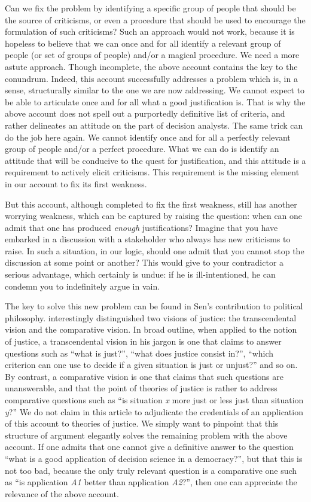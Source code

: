 \documentclass[preprint,11pt]{elsarticle}
\begin{document}
Can we fix the problem by identifying a specific group of people that should be the source of criticisms, or even a procedure that should be used to encourage the formulation of such criticisms? Such an approach would not work, because it is hopeless to believe that we can once and for all identify a relevant group of people (or set of groups of people) and/or a magical procedure. We need a more astute approach. Though incomplete, the above account contains the key to the conundrum. Indeed, this account successfully addresses a problem which is, in a sense, structurally similar to the one we are now addressing. We cannot expect to be able to articulate once and for all what a good justification is. That is why the above account does not spell out a purportedly definitive list of criteria, and rather delineates an attitude on the part of decision analysts. The same trick can do the job here again. We cannot identify once and for all a perfectly relevant group of people and/or a perfect procedure. What we can do is identify an attitude that will be conducive to the quest for justification, and this attitude is a requirement to actively elicit criticisms. This requirement is the missing element in our account to fix its first weakness.

But this account, although completed to fix the first weakness, still has another worrying weakness, which can be captured by raising the question: when can one admit that one has produced \emph{enough} justifications? Imagine that you have embarked in a discussion with a stakeholder who always has new criticisms to raise. In such a situation, in our logic, should one admit that you cannot stop the discussion at some point or another? This would give to your contradictor a serious advantage, which certainly is undue: if he is ill-intentioned, he can condemn you to indefinitely argue in vain.

The key to solve this new problem can be found in Sen's contribution to political philosophy. \cite{sen_idea_2009} interestingly distinguished two visions of justice: the transcendental vision and the comparative vision. In broad outline, when applied to the notion of justice, a transcendental vision in his jargon is one that claims to answer questions such as ``what is just?'', ``what does justice consist in?'', ``which criterion can one use to decide if a given situation is just or unjust?'' and so on. By contrast, a comparative vision is one that claims that such questions are unanswerable, and that the point of theories of justice is rather to address comparative questions such as ``is situation \emph{x} more just or less just than situation \emph{y}?'' We do not claim in this article to adjudicate the credentials of an application of this account to theories of justice. We simply want to pinpoint that this structure of argument elegantly solves the remaining problem with the above account. If one admits that one cannot give a definitive answer to the question ``what is a good application of decision science in a democracy?'', but that this is not too bad, because the only truly relevant question is a comparative one such as ``is application \emph{A1} better than application \emph{A2}?'', then one can appreciate the relevance of the above account.
\end{document}

